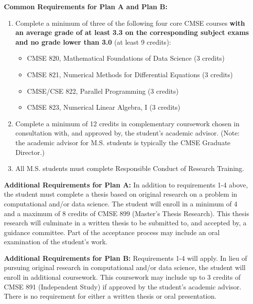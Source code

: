 \vspace{3mm}
\noindent
\textbf{Common Requirements for Plan A and Plan B:}

\begin{enumerate}

\item Complete a minimum of three of the following four core CMSE
  courses \textbf{with an average grade of at least 3.3 on the
    corresponding subject exams and no grade lower than 3.0} (at least
  9 credits):

\begin{itemize}
    \item  CMSE 820, Mathematical Foundations of Data Science (3 credits)  
    \item  CMSE 821, Numerical Methods for Differential Equations (3 credits)  
    \item  CMSE/CSE 822, Parallel Programming (3 credits)  
    \item  CMSE 823, Numerical Linear Algebra, I (3 credits)  
\end{itemize}

\item Complete a minimum of 12 credits in complementary coursework
  chosen in consultation with, and approved by, the student’s academic
  advisor.  (Note: the academic advisor for M.S. students is typically the CMSE Graduate Director.)
 
\item All M.S. students must complete Responsible Conduct of Research
  Training.
\end{enumerate}

\vspace{3mm}
\noindent
\textbf{Additional Requirements for Plan A:} In addition to
requirements 1-4 above, the student must complete a thesis based on
original research on a problem in computational and/or data
science. The student will enroll in a minimum of 4 and a maximum of 8
credits of CMSE 899 (Master’s Thesis Research). This thesis research
will culminate in a written thesis to be submitted to, and accepted
by, a guidance committee. Part of the acceptance process may include
an oral examination of the student’s work.

\vspace{3mm}
\noindent
\textbf{Additional Requirements for Plan B:} Requirements 1-4 will
apply. In lieu of pursuing original research in computational and/or
data science, the student will enroll in additional coursework. This
coursework may include up to 3 credits of CMSE 891 (Independent Study)
if approved by the student’s academic advisor. There is no requirement
for either a written thesis or oral presentation.

